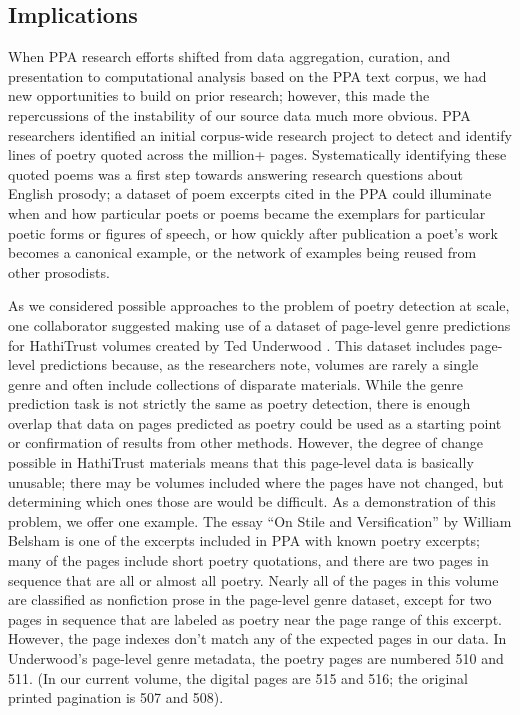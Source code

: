 \documentclass{anthology-ch}         %
\begin{document}
\subsection{Implications}

When PPA research efforts shifted from data aggregation, curation, and presentation to computational analysis based on the PPA text corpus, we had new opportunities to build on prior research; however, this made the repercussions of the instability of our source data much more obvious. PPA researchers identified an initial corpus-wide research project to detect and identify lines of poetry quoted across the million+ pages. Systematically identifying these quoted poems was a first step towards answering research questions about English prosody; a dataset of poem excerpts cited in the PPA could illuminate when and how particular poets or poems became the exemplars for particular poetic forms or figures of speech, or how quickly after publication a poet’s work becomes a canonical example, or the network of examples being reused from other prosodists.

As we considered possible approaches to the problem of poetry detection at scale, one collaborator suggested making use of a dataset of page-level genre predictions for HathiTrust volumes created by Ted Underwood \cite{underwood_page-level_2014}. This dataset includes page-level predictions because, as the researchers note, volumes are rarely a single genre and often include collections of disparate materials. While the genre prediction task is not strictly the same as poetry detection, there is enough overlap that data on pages predicted as poetry could be used as a starting point or confirmation of results from other methods. However, the degree of change possible in HathiTrust materials means that this page-level data is basically unusable; there may be volumes included where the pages have not changed, but determining which ones those are would be difficult. As a demonstration of this problem, we offer one example. The essay “On Stile and Versification” by William Belsham \cite{belsham_stile_1799} is one of the excerpts included in PPA with known poetry excerpts; many of the pages include short poetry quotations, and there are two pages in sequence that are all or almost all poetry. Nearly all of the pages in this volume are classified as nonfiction prose in the page-level genre dataset, except for two pages in sequence that are labeled as poetry near the page range of this excerpt. However, the page indexes don’t match any of the expected pages in our data. In Underwood’s page-level genre metadata, the poetry pages are numbered 510 and 511. (In our current volume, the digital pages are 515 and 516; the original printed pagination is 507 and 508).
\end{document}
